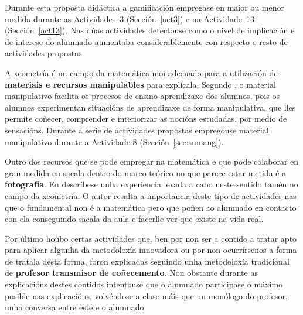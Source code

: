 Durante esta proposta didáctica a gamificación empregase en maior ou menor medida durante as Actividades~3 (Sección~\ref{act3}) e na Actividade~13 (Sección~\ref{act13}). Nas dúas actividades detectouse como o nivel de implicación e de interese do alumnado aumentaba considerablemente con respecto o resto de actividades propostas.

A xeometría é un campo da matemática moi adecuado para a utilización de \textbf{materiais e recursos manipulables} para explicala. Segundo \cite{moreiro2010materiales},  o material manipulativo facilita os procesos de ensino-aprendizaxe dos alumnos, pois os alumnos experimentan situacións de aprendizaxe de forma manipulativa, que lles permite coñecer, comprender e interiorizar as nocións estudadas, por medio de sensacións. Durante a serie de actividades propostas empregouse material manipulativo durante a Actividade 8 (Sección~\ref{sec:sumang}).

Outro dos recursos que se pode empregar na matemática e que pode colaborar en gran medida en sacala dentro do marco teórico no que parece estar metida é a \textbf{fotografía}. En  descríbese unha experiencia levada a cabo neste sentido tamén no campo da xeometría. O autor resalta a importancia deste tipo de actividades nas que o fundamental non é a matemática pero que poñen ao alumnado en contacto con ela conseguindo sacala da aula e facerlle ver que existe na vida real.

Por último houbo certas actividades que, ben por non ser a contido a tratar apto para aplicar algunha da metodoloxía innovadora ou por non ocurrírsenos a forma de tratala desta forma, foron explicadas seguindo unha metodoloxía tradicional de \textbf{profesor transmisor de coñecemento}. Non obstante durante as explicacións destes contidos intentouse que o alumnado participase o máximo posible nas explicacións, volvéndose a clase máis que un monólogo do profesor, unha conversa entre este e o alumnado.

